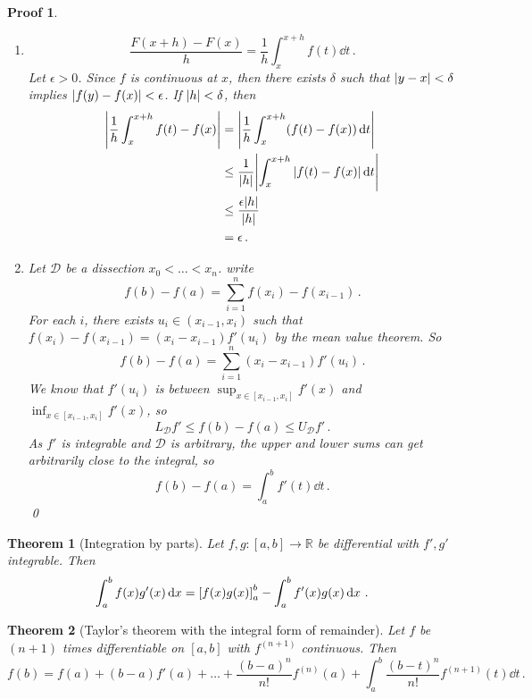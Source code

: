 \documentclass{article}
\theoremstyle{plain}\theoremheaderfont{\normalfont\itshape}\theorembodyfont{\rmfamily}\theoremseparator{.}\newtheorem*{rem}{Remark}\newtheorem*{ex}{Example}\newtheorem*{proof}{Proof}\newtheorem*{altp}{Alternative proof}
\theoremstyle{plain}\theoremheaderfont{\normalfont\bfseries}\theorembodyfont{\rmfamily}\theoremseparator{.}\newtheorem{thm}{Theorem}[section]\newtheorem{lem}[thm]{Lemma}\newtheorem{prop}[thm]{Proposition}\newtheorem*{cor}{Corollary}\newtheorem{defn}[thm]{Definition}\newtheorem{clm}[thm]{Claim}\newtheorem{clminproof}{Claim}
\theoremstyle{break}\theoremheaderfont{\normalfont\itshape}\theorembodyfont{\rmfamily}\theoremseparator{.\medskip}\newtheorem*{proofskip}{Proof}\newtheorem*{exs}{Examples}\newtheorem*{rems}{Remarks}
\theoremstyle{break}\theoremheaderfont{\normalfont\bfseries}\theorembodyfont{\rmfamily}\theoremseparator{.\medskip}\newtheorem{lemskip}[thm]{Lemma}\newtheorem{defnskip}[thm]{Definition}\newtheorem{propskip}[thm]{Proposition}\newtheorem{thmskip}[thm]{Theorem}
\newcommand{\qed}{\hfill\ensuremath{\Box}}
\begin{document}
    \begin{proofskip}
        \begin{enumerate}[label=(\roman*)]
            \item \[\frac{F(x+h)-F(x)}{h}=\frac{1}{h}\int_{x}^{x+h}f(t)\dd{t}\,.\]
            Let \(\epsilon>0\). Since \(f\) is continuous at \(x\), then there exists \(\delta\) such that \(\abs{y-x}<\delta\) implies \(\abs{f(y)-f(x)}<\epsilon\). If \(\abs{h}<\delta\), then
            \begin{align*}
                \abs{\frac{1}{h}\int_{x}^{x+h}f(t)-f(x)}&=\abs{\frac{1}{h}\int_{x}^{x+h}(f(t)-f(x))\dd{t}}\\
                &\le\frac{1}{\abs{h}}\abs{\int_{x}^{x+h}\abs{f(t)-f(x)}\dd{t}}\\
                &\le\frac{\epsilon\abs{h}}{\abs{h}}\\
                &=\epsilon\,.
            \end{align*}
            \item Let \(\mathcal{D}\) be a dissection \(x_0<\dots<x_n\). write
            \[f(b)-f(a)=\sum_{i=1}^{n}f(x_i)-f(x_{i-1})\,.\]
            For each \(i\), there exists \(u_i\in(x_{i-1},x_i)\) such that \(f(x_i)-f(x_{i-1})=(x_i-x_{i-1})f'(u_i)\) by the mean value theorem. So
            \[f(b)-f(a)=\sum_{i=1}^{n}(x_i-x_{i-1})f'(u_i)\,.\]
            We know that \(f'(u_i)\) is between \(\displaystyle\sup_{x\in[x_{i-1},x_i]}f'(x)\) and \(\displaystyle\inf_{x\in[x_{i-1},x_i]}f'(x)\), so
            \[L_{\mathcal{D}}f'\le f(b)-f(a)\le U_{\mathcal{D}}f'\,.\]
            As \(f'\) is integrable and \(\mathcal{D}\) is arbitrary, the upper and lower sums can get arbitrarily close to the integral, so
            \[f(b)-f(a)=\int_{a}^{b}f'(t)\dd{t}\,.\]\qed
        \end{enumerate}
    \end{proofskip}
    \begin{thm}[Integration by parts]
        Let \(f,g:[a,b]\to\mathbb{R}\) be differential with \(f',g'\) integrable. Then
        \[\int_{a}^{b}f(x)g'(x)\dd{x}=\qty[f(x)g(x)]_{a}^{b}-\int_{a}^{b}f'(x)g(x)\dd{x}\,.\]        
    \end{thm}
    \begin{thm}[Taylor's theorem with the integral form of remainder]
        Let \(f\) be \((n+1)\) times differentiable on \([a,b]\) with \(f^{(n+1)}\) continuous. Then
        \[f(b)=f(a)+(b-a)f'(a)+\dots+\frac{(b-a)^n}{n!}f^{(n)}(a)+\int_{a}^{b}\frac{(b-t)^n}{n!}f^{(n+1)}(t)\dd{t}\,.\]
    \end{thm}
\end{document}

